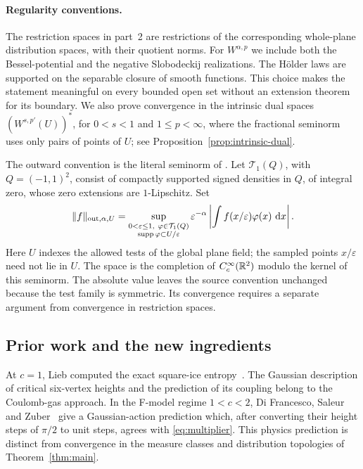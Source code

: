 \paragraph{Regularity conventions.}
The restriction spaces in part~2 are restrictions of the corresponding
whole-plane distribution spaces, with their quotient norms. For
\(W^{\alpha,p}\) we include both the Bessel-potential and the
negative Slobodeckij realizations. The Hölder
laws are supported on the separable closure of smooth functions. This
choice makes the statement meaningful on every bounded open set without
an extension theorem for its boundary. We also prove convergence in the
intrinsic dual spaces \((W^{s,p'}(U))^*\), for \(0<s<1\) and
\(1\le p<\infty\), where the fractional seminorm uses
only pairs of points of \(U\); see Proposition~\ref{prop:intrinsic-dual}.

The outward convention is the literal seminorm of
\cite[Definition~2.6(iii)]{DKLM2026}. Let \(\mathcal T_1(Q)\), with
\(Q=(-1,1)^2\), consist of compactly supported signed densities in \(Q\),
of integral zero, whose zero extensions are \(1\)-Lipschitz. Set
\begin{equation}\label{eq:source-holder}
 \|f\|_{\mathrm{out},\alpha,U}
 =\sup_{\substack{0<\varepsilon\le1,\ \varphi\in\mathcal T_1(Q)\\
                   \operatorname{supp}\varphi\subset U/\varepsilon}}
   \varepsilon^{-\alpha}
   \left|\int f(x/\varepsilon)\varphi(x)\,\,\mathrm d x\right|.
\end{equation}
Here \(U\) indexes the allowed tests of the global plane field;
the sampled points \(x/\varepsilon\) need not lie in \(U\).
The space is the completion of \(C_c^\infty(\mathbb R^2)\) modulo the
kernel of this seminorm.
The absolute value leaves the source convention unchanged because
the test family is symmetric. Its convergence requires a separate
argument from convergence in restriction spaces.

\subsection{Prior work and the new ingredients}

At \(c=1\), Lieb computed the exact square-ice entropy~\cite{Lieb1967}.
The Gaussian description of critical six-vertex heights and the prediction
of its coupling belong to the Coulomb-gas approach. In the F-model regime
\(1<c<2\), Di Francesco, Saleur and Zuber~\cite[Section~2.3]{DFSZ1987}
give a Gaussian-action prediction which, after converting their height
steps of \(\pi/2\) to unit steps, agrees with \eqref{eq:multiplier}.
This physics prediction is distinct from convergence in the measure
classes and distribution topologies of Theorem~\ref{thm:main}.

